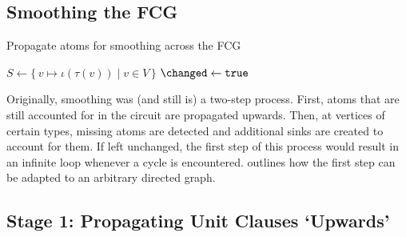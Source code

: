 \documentclass{article}
\theoremstyle{definition}
\begin{document}
\subsection{Smoothing the FCG}

\begin{algorithm}
  \caption{Propagate atoms for smoothing across the FCG}\label{alg:smoothing}
  $S \gets \{\, v \mapsto \iota(\tau(v)) \mid v \in V \,\}$\;
  $\changed \gets \texttt{true}$\;
\end{algorithm}


Originally, smoothing was (and still is) a two-step process. First, atoms that
are still accounted for in the circuit are propagated upwards. Then, at vertices
of certain types, missing atoms are detected and additional sinks are created to
account for them. If left unchanged, the first step of this process would result
in an infinite loop whenever a cycle is encountered. 
outlines how the first step can be adapted to an arbitrary directed graph.

\subsection{Stage 1: Propagating Unit Clauses `Upwards'}
\end{document}

